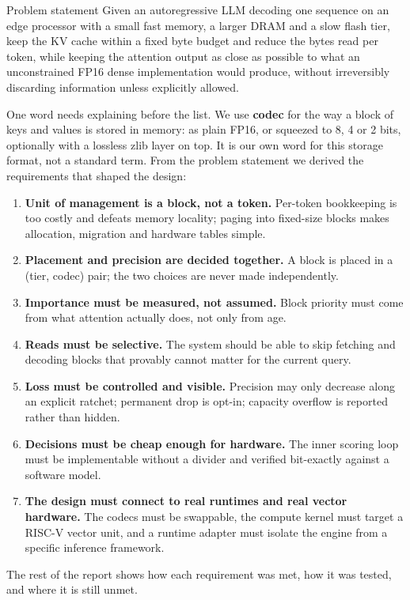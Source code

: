 \documentclass[12pt,a4paper]{report}
\begin{document}
\begin{calloutbox}{Problem statement}
Given an autoregressive LLM decoding one sequence on an edge processor with a small fast memory, a larger DRAM and a slow flash tier, keep the KV cache within a fixed byte budget and reduce the bytes read per token, while keeping the attention output as close as possible to what an unconstrained FP16 dense implementation would produce, without irreversibly discarding information unless explicitly allowed.

\end{calloutbox}
One word needs explaining before the list. We use \textbf{codec} for the way a block of keys and values is stored in memory: as plain FP16, or squeezed to 8, 4 or 2 bits, optionally with a lossless zlib layer on top. It is our own word for this storage format, not a standard term. From the problem statement we derived the requirements that shaped the design:

\begin{enumerate}
\item \textbf{Unit of management is a block, not a token.} Per-token bookkeeping is too costly and defeats memory locality; paging into fixed-size blocks makes allocation, migration and hardware tables simple.
\item \textbf{Placement and precision are decided together.} A block is placed in a (tier, codec) pair; the two choices are never made independently.
\item \textbf{Importance must be measured, not assumed.} Block priority must come from what attention actually does, not only from age.
\item \textbf{Reads must be selective.} The system should be able to skip fetching and decoding blocks that provably cannot matter for the current query.
\item \textbf{Loss must be controlled and visible.} Precision may only decrease along an explicit ratchet; permanent drop is opt-in; capacity overflow is reported rather than hidden.
\item \textbf{Decisions must be cheap enough for hardware.} The inner scoring loop must be implementable without a divider and verified bit-exactly against a software model.
\item \textbf{The design must connect to real runtimes and real vector hardware.} The codecs must be swappable, the compute kernel must target a RISC-V vector unit, and a runtime adapter must isolate the engine from a specific inference framework.
\end{enumerate}
The rest of the report shows how each requirement was met, how it was tested, and where it is still unmet.
\end{document}
